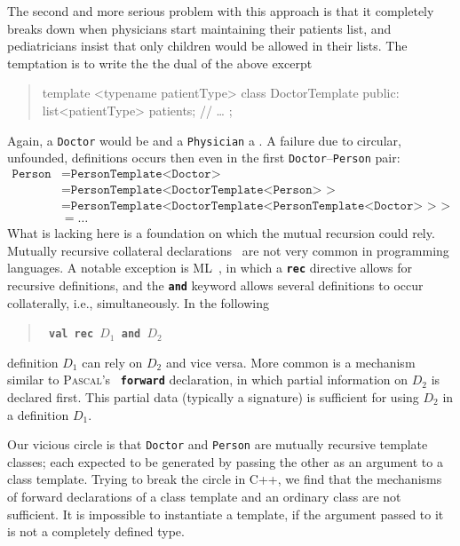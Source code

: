\documentclass[11pt]{article}
\numberwithin{figure}{section}
\newcommand\CC{\Lang{\mbox{C++}}\xspace}
\newcommand\Lang[1]{\textsc{#1}}
\newcommand{\kw}[1]{\texttt{\textbf{#1}}}
\newcommand{\cd}[1]{\texttt{#1}}
\newenvironment{excerpt}{\begin{quote}\begin{minipage}\textwidth}{\end{minipage}\end{quote}}
\begin{document}
The second and more serious problem with this approach is that it completely breaks down
    when physicians start maintaining their patients list, and pediatricians
    insist that only children would be allowed in their lists.
The temptation is to write the the dual of the above excerpt
\begin{excerpt}
\CPP
    template <typename patientType>
        class DoctorTemplate { public:
            list<patientType> patients;
            //{} \ldots
        };
\END\PROGbj{}
\end{excerpt}
Again, a \cd{Doctor} would be \PROGca{}
    and a \cd{Physician} a \PROGcb{}.
A failure due to circular, unfounded, definitions occurs then even
    in the first \cd{Doctor}--\cd{Person} pair: \[
\begin{split}
\cd{Person} & =  \cd{PersonTemplate<Doctor>} \\
            & = \cd{PersonTemplate<DoctorTemplate<Person> >} \\
            & = \cd{PersonTemplate<DoctorTemplate<PersonTemplate<Doctor> > >} \\
            & = \ldots
\end{split}
\]
What is lacking here is a foundation on which the mutual recursion could rely.
Mutually recursive collateral
    declarations~\cite[Chap.~4]{Watt:90} are not very common
    in programming languages.
A notable exception is ML~\cite{Paulson:91},
    in which a \kw{rec} directive allows
    for recursive definitions, and the \kw{and} keyword
    allows several definitions to occur collaterally, i.e., simultaneously.
In the following
\begin{excerpt}
    \tt
    \textbf{val rec}
        $D_1$ \textbf{and} $D_2$
\end{excerpt}
definition $D_1$ can rely on $D_2$ and vice versa.
More common is a mechanism similar to \textsc{Pascal}'s~\cite{Wirth:71}
    \kw{forward} declaration, in which partial information on $D_2$ is
    declared first.
This partial data (typically a signature) is sufficient for using $D_2$
    in a definition $D_1$.

Our vicious circle is that \cd{Doctor} and \cd{Person} are mutually
    recursive template classes; each expected
    to be generated by passing the other as an argument to a class template.
Trying to break the circle in \CC, we find that
    the mechanisms of forward declarations of
    a class template and an ordinary class are not sufficient.
It is impossible to instantiate a template, if the argument
    passed to it is not a completely defined type.
\end{document}
